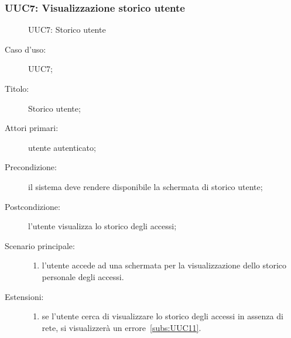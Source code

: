 \documentclass[../../../analisi-dei-requisiti.tex]{subfiles}
\begin{document}
\subsubsection{UUC7: Visualizzazione storico utente}%
\label{subs:UUC7}

\begin{figure}[H]
  \centering
  \caption{UUC7: Storico utente}%
  \label{fig:UUC7}
\end{figure}

\begin{description}
  \item[Caso d'uso:] UUC7;
  \item[Titolo:] Storico utente;
  \item[Attori primari:] utente autenticato;
  \item[Precondizione:] il sistema deve rendere disponibile la schermata di storico utente;
  \item[Postcondizione:] l'utente visualizza lo storico degli accessi;
  \item[Scenario principale:]
        \begin{enumerate}
          \item l'utente accede ad una schermata per la visualizzazione dello storico personale degli accessi.
        \end{enumerate}
  \item[Estensioni:]
        \begin{enumerate}
          \item se l'utente cerca di visualizzare lo storico degli accessi in assenza di rete, si visualizzerà un errore~\ref{subs:UUC11}.
        \end{enumerate}
\end{description}
\end{document}
